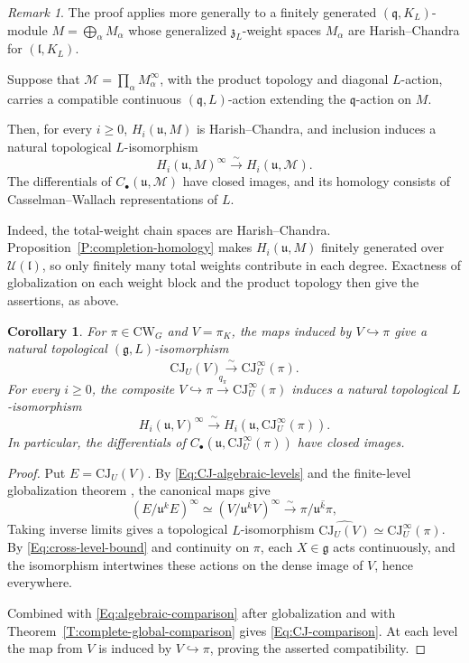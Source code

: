 \documentclass[a4paper,12pt]{amsart}
\numberwithin{equation}{section}
\theoremstyle{plain}
\newtheorem{corollary}[theorem]{Corollary}
\theoremstyle{definition}
\theoremstyle{remark}
\newtheorem{remark}[theorem]{Remark}
\begin{document}
\begin{remark}\label{R:weightwise-globalization}
The proof applies more generally to a finitely generated $(\mathfrak q,K_L)$-module $M=\bigoplus_\alpha M_\alpha$ whose generalized $\mathfrak z_L$-weight spaces $M_\alpha$ are Harish--Chandra for $(\mathfrak l,K_L)$.

Suppose that $\mathcal M=\prod_\alpha M_\alpha^\infty$, with the product topology and diagonal $L$-action, carries a compatible continuous $(\mathfrak q,L)$-action extending the $\mathfrak q$-action on $M$.

Then, for every $i\geq0$, $H_i(\mathfrak u,M)$ is Harish--Chandra, and inclusion induces a natural topological $L$-isomorphism
\[
 H_i(\mathfrak u,M)^\infty\xrightarrow{\ \sim\ }H_i(\mathfrak u,\mathcal M).
\]
The differentials of $C_\bullet(\mathfrak u,\mathcal M)$ have closed images, and its homology consists of Casselman--Wallach representations of $L$.

Indeed, the total-weight chain spaces are Harish--Chandra.
Proposition~\ref{P:completion-homology} makes $H_i(\mathfrak u,M)$ finitely generated over $\mathcal U(\mathfrak l)$, so only finitely many total weights contribute in each degree.
Exactness of globalization on each weight block and the product topology then give the assertions, as above.
\end{remark}

\begin{corollary}\label{C:CJ-comparison}
For $\pi\in\mathrm{CW}_G$ and $V=\pi_K$, the maps induced by $V\hookrightarrow\pi$ give a natural topological $(\mathfrak g,L)$-isomorphism
\[
 \widehat{\mathrm{CJ}_U(V)}\xrightarrow{\sim}\mathrm{CJ}^{\infty}_U(\pi).
\]
For every $i\geq0$, the composite $V\hookrightarrow\pi\xrightarrow{q_\pi}\mathrm{CJ}^{\infty}_U(\pi)$ induces a natural topological $L$-isomorphism
\begin{equation}\label{Eq:CJ-comparison}
 H_i(\mathfrak u,V)^\infty\xrightarrow{\ \sim\ }
 H_i(\mathfrak u,\mathrm{CJ}^{\infty}_U(\pi)).
\end{equation}
In particular, the differentials of $C_\bullet(\mathfrak u,\mathrm{CJ}^{\infty}_U(\pi))$ have closed images.
\end{corollary}
\begin{proof}
Put $E=\mathrm{CJ}_U(V)$.
By \eqref{Eq:CJ-algebraic-levels} and the finite-level globalization theorem \cite[Theorem~13.1 and Remark~13.2]{CWYZ}, the canonical maps give
\[
 (E/\mathfrak u^kE)^\infty\simeq(V/\mathfrak u^k V)^\infty
 \xrightarrow{\ \sim\ }\pi/\overline{\mathfrak u^k\pi},
\]
Taking inverse limits gives a topological $L$-isomorphism $\widehat{\mathrm{CJ}_U(V)}\simeq\mathrm{CJ}^{\infty}_U(\pi)$.
By \eqref{Eq:cross-level-bound} and continuity on $\pi$, each $X\in\mathfrak g$ acts continuously, and the isomorphism intertwines these actions on the dense image of $V$, hence everywhere.

Combined with \eqref{Eq:algebraic-comparison} after globalization and with Theorem~\ref{T:complete-global-comparison} gives \eqref{Eq:CJ-comparison}.
At each level the map from $V$ is induced by $V\hookrightarrow\pi$, proving the asserted compatibility.
\end{proof}
\end{document}
